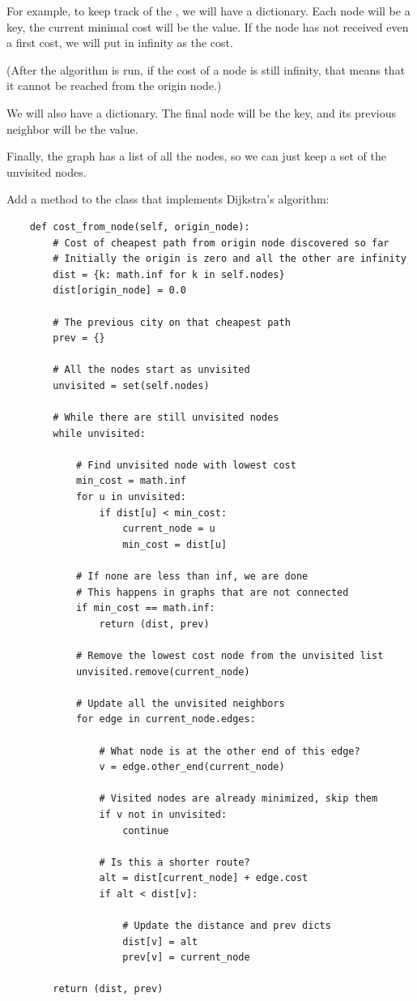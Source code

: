 For example, to keep track of the , we will have a
 dictionary. Each node will be a key, the current minimal
cost will be the value.  If the node has not received even a first
cost, we will put in infinity as the cost.

(After the algorithm is run, if the cost of a node is still infinity,
that means that it cannot be reached from the origin node.)

We will also have a  dictionary. The final node will be
the key, and its previous neighbor will be the value.

Finally, the graph has a list of all the nodes, so we can just keep a
set of the unvisited nodes.

Add a method to the  class that implements Dijkstra's algorithm:
\begin{verbatim}
    def cost_from_node(self, origin_node):
        # Cost of cheapest path from origin node discovered so far
        # Initially the origin is zero and all the other are infinity
        dist = {k: math.inf for k in self.nodes}
        dist[origin_node] = 0.0

        # The previous city on that cheapest path
        prev = {}

        # All the nodes start as unvisited
        unvisited = set(self.nodes)
    
        # While there are still unvisited nodes
        while unvisited:

            # Find unvisited node with lowest cost
            min_cost = math.inf
            for u in unvisited:
                if dist[u] < min_cost:
                    current_node = u
                    min_cost = dist[u]

            # If none are less than inf, we are done
            # This happens in graphs that are not connected
            if min_cost == math.inf:
                return (dist, prev)
            
            # Remove the lowest cost node from the unvisited list
            unvisited.remove(current_node)

            # Update all the unvisited neighbors
            for edge in current_node.edges:

                # What node is at the other end of this edge?
                v = edge.other_end(current_node)

                # Visited nodes are already minimized, skip them
                if v not in unvisited:
                    continue

                # Is this a shorter route?
                alt = dist[current_node] + edge.cost
                if alt < dist[v]:

                    # Update the distance and prev dicts
                    dist[v] = alt
                    prev[v] = current_node

        return (dist, prev)
\end{verbatim}

